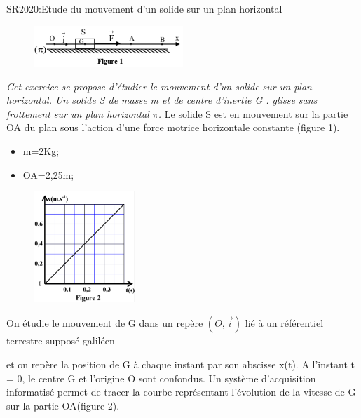 \documentclass[12pt]{article}
\begin{document}
\vspace{2cm}

\begin{Box2}{SR2020:Etude du mouvement d’un solide sur un plan horizontal }

  \begin{figure}
    \includegraphics[width=0.5\textwidth]{./img/planpi.png} 
  \end{figure}
  
  \emph{Cet exercice se propose d’étudier le mouvement d’un solide sur un plan horizontal.
Un solide S de masse m et de centre d’inertie G . glisse sans frottement sur un plan horizontal $\pi$.}
Le solide S est en mouvement sur la partie OA
du plan sous l’action d’une force motrice
horizontale constante (figure 1).

\begin{itemize}
  \item m=2Kg;
  \item OA=2,25m;
\end{itemize}

  \begin{figure}
    \vspace{-4cm}
    \includegraphics[width=0.34\textwidth]{./img/vitesse_plan.png} 
  \end{figure}
  
On étudie le mouvement de G dans un repère
$(O, \vec{i} )$
lié à un référentiel terrestre supposé galiléen

et on repère la position de G à chaque instant par son abscisse x(t).
A l’instant t = 0, le centre G et l’origine O sont confondus.
Un système d’acquisition informatisé permet de tracer la courbe
représentant l’évolution de la vitesse de G sur la partie OA(figure 2).


\end{Box2}
\end{document}

